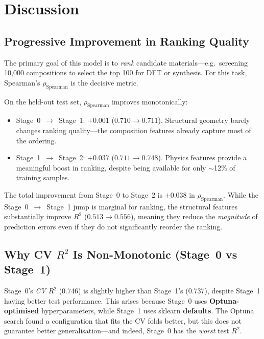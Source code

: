 \documentclass[11pt,a4paper]{article}
\newcommand{\Rtwo}{R^{2}}
\newcommand{\rhoS}{\rho_{\text{Spearman}}}
\begin{document}
\section{Discussion}
\label{sec:discussion}

\subsection{Progressive Improvement in Ranking Quality}

The primary goal of this model is to \emph{rank} candidate materials---e.g.\
screening 10{,}000 compositions to select the top 100 for DFT or synthesis.
For this task, Spearman's $\rhoS$ is the decisive metric.

On the held-out test set, $\rhoS$ improves monotonically:
\begin{itemize}[leftmargin=*]
      \item \mbox{Stage~0 $\to$ Stage~1}: $+0.001$ ($0.710 \to 0.711$).
            Structural geometry barely changes ranking quality---the composition
            features already capture most of the ordering.
      \item \mbox{Stage~1 $\to$ Stage~2}: $+0.037$ ($0.711 \to 0.748$).
            Physics features provide a meaningful boost in ranking, despite being
            available for only $\sim$12\% of training samples.
\end{itemize}

The total improvement from Stage~0 to Stage~2 is $+0.038$ in $\rhoS$.
While the \mbox{Stage~0 $\to$ Stage~1} jump is marginal for ranking, the structural
features substantially improve $\Rtwo$ ($0.513 \to 0.556$), meaning they
reduce the \emph{magnitude} of prediction errors even if they do not
significantly reorder the ranking.

\subsection{Why CV $\Rtwo$ Is Non-Monotonic (Stage~0 vs Stage~1)}

Stage~0's \emph{CV} $\Rtwo$ (0.746) is slightly higher than Stage~1's (0.737),
despite Stage~1 having better test performance.  This arises because Stage~0
uses \textbf{Optuna-optimised} hyperparameters, while Stage~1 uses sklearn
\textbf{defaults}.  The Optuna search found a configuration that fits the CV
folds better, but this does not guarantee better generalisation---and indeed,
Stage~0 has the \emph{worst} test $\Rtwo$.
\end{document}
